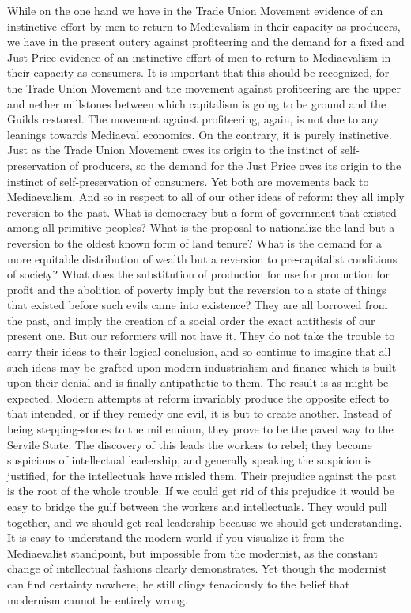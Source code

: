 \documentclass{book}
\begin{document}
While on the one hand we have in the Trade Union Movement evidence of an instinctive effort by men to return to Medievalism in their capacity as producers, we have in the present outcry against profiteering and the demand for a fixed and Just Price evidence of an instinctive effort of men to return to Mediaevalism in their capacity as consumers. It is important that this should be recognized, for the Trade Union Movement and the movement against profiteering are the upper and nether millstones between which capitalism is going to be ground and the Guilds restored. The movement against profiteering, again, is not due to any leanings towards Mediaeval economics. On the contrary, it is purely instinctive. Just as the Trade Union Movement owes its origin to the instinct of self-preservation of producers, so the demand for the Just Price owes its origin to the instinct of self-preservation of consumers. Yet both are movements back to Mediaevalism. And so in respect to all of our other ideas of reform: they all imply reversion to the past. What is democracy but a form of government that existed among all primitive peoples? What is the proposal to nationalize the land but a reversion to the oldest known form of land tenure? What is the demand for a more equitable distribution of wealth but a reversion to pre-capitalist conditions of society? What does the substitution of production for use for production for profit and the abolition of poverty imply but the reversion to a state of things that existed before such evils came into existence? They are all borrowed from the past, and imply the creation of a social order the exact antithesis of our present one. But our reformers will not have it. They do not take the trouble to carry their ideas to their logical conclusion, and so continue to imagine that all such ideas may be grafted upon modern industrialism and finance which is built upon their denial and is finally antipathetic to them. The result is as might be expected. Modern attempts at reform invariably produce the opposite effect to that intended, or if they remedy one evil, it is but to create another. Instead of being stepping-stones to the millennium, they prove to be the paved way to the Servile State. The discovery of this leads the workers to rebel; they become suspicious of intellectual leadership, and generally speaking the suspicion is justified, for the intellectuals have misled them. Their prejudice against the past is the root of the whole trouble. If we could get rid of this prejudice it would be easy to bridge the gulf between the workers and intellectuals. They would pull together, and we should get real leadership because we should get understanding. It is easy to understand the modern world if you visualize it from the Mediaevalist standpoint, but impossible from the modernist, as the constant change of intellectual fashions clearly demonstrates. Yet though the modernist can find certainty nowhere, he still clings tenaciously to the belief that modernism cannot be entirely wrong.
\end{document}
